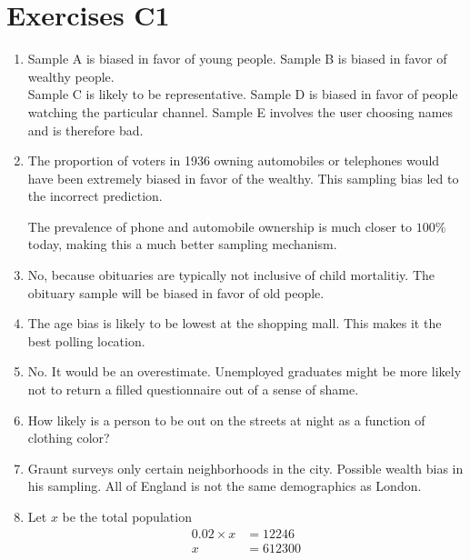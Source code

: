 \chapter*{Exercises C1}

\begin{enumerate}
	\item Sample A is biased in favor of young people. Sample B is biased in favor of wealthy people.  \\ Sample C is likely to be representative. Sample D is biased in favor of people watching the particular channel. Sample E involves the user choosing names and is therefore bad.
	
	\item The proportion of voters in 1936 owning automobiles or telephones would have been extremely biased in favor of the wealthy. This sampling bias led to the incorrect prediction.
	
	The prevalence of phone and automobile ownership is much closer to $ 100 \% $ today, making this a much better sampling mechanism. 
	
	\item No, because obituaries are typically not inclusive of child mortalitiy. The obituary sample will be biased in favor of old people.
	
	\item The age bias is likely to be lowest at the shopping mall. This makes it the best polling location.
	
	\item No. It would be an overestimate. Unemployed graduates might be more likely not to return a filled questionnaire out of a sense of shame. 
	
	\item How likely is a person to be out on the streets at night as a function of clothing color? 
	
	\item Graunt surveys only certain neighborhoods in the city. Possible wealth bias in his sampling. All of England is not the same demographics as London.
	
	\item Let $ x $ be the total population \\
	
	\begin{subequations}
		\begin{align}
			0.02 \times x &= 12246 \\
			x &= 612300
		\end{align}
	\end{subequations}
	

\end{enumerate}
